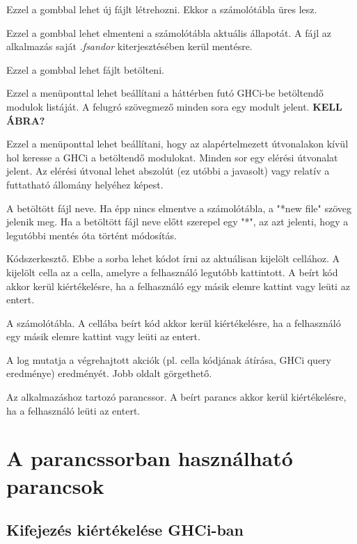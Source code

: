 \begin{compactenum}
	\item Ezzel a gombbal lehet új fájlt létrehozni. Ekkor a számolótábla üres lesz.
	\item Ezzel a gombbal lehet elmenteni a számolótábla aktuális állapotát. A fájl az alkalmazás saját \textit{.fsandor} kiterjesztésében kerül mentésre.
	\item Ezzel a gombbal lehet fájlt betölteni.
	\item Ezzel a menüponttal lehet beállítani a háttérben futó GHCi-be betöltendő modulok listáját. A felugró szövegmező minden sora egy modult jelent. \textbf{KELL ÁBRA?}
	\item Ezzel a menüponttal lehet beállítani, hogy az alapértelmezett útvonalakon kívül hol keresse a GHCi a betöltendő modulokat. Minden sor egy elérési útvonalat jelent. Az elérési útvonal lehet abszolút (ez utóbbi a javasolt) vagy relatív a futtatható állomány helyéhez képest.
	\item A betöltött fájl neve. Ha épp nincs elmentve a számolótábla, a "*new file" szöveg jelenik meg. Ha a betöltött fájl neve előtt szerepel egy "*", az azt jelenti, hogy a legutóbbi mentés óta történt módosítás.
	\item Kódszerkesztő. Ebbe a sorba lehet kódot írni az aktuálisan kijelölt cellához. A kijelölt cella az a cella, amelyre a felhasználó legutóbb kattintott. A beírt kód akkor kerül kiértékelésre, ha a felhasználó egy másik elemre kattint vagy leüti az entert.
	\item A számolótábla. A cellába beírt kód akkor kerül kiértékelésre, ha a felhasználó egy másik elemre kattint vagy leüti az entert.
	\item A log mutatja a végrehajtott akciók (pl. cella kódjának átírása, GHCi query eredménye) eredményét. Jobb oldalt görgethető.
	\item Az alkalmazáshoz tartozó parancssor. A beírt parancs akkor kerül kiértékelésre, ha a felhasználó leüti az entert.
\end{compactenum}

\section{A parancssorban használható parancsok}

\subsection{Kifejezés kiértékelése GHCi-ban}

